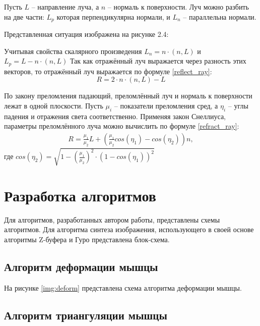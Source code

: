 Пусть $L$ -- направление луча, а $n$ -- нормаль к поверхности. 
Луч можно разбить на две части: $L_p$ которая перпендикулярна нормали, и  $L_n$ – параллельна нормали.

Представленная ситуация изображена на рисунке 2.4:


Учитывая свойства скалярного произведения $L_n = n \cdot (n, L)$ и  $L_p = L - n \cdot (n,L)$
Так как отражённый луч выражается через разность этих векторов, то отражённый луч выражается по формуле \ref{reflect_ray}:
\begin{equation}
\label{reflect_ray}
R = 2 \cdot n \cdot (n, L) - L
\end{equation}

По закону преломления падающий, преломлённый луч и нормаль к поверхности лежат в одной плоскости. 
Пусть $ \mu_i$ -- показатели преломления сред, а $\eta_i$ – углы падения и отражения света соответственно. 
Применяя закон Снеллиуса, параметры преломлённого луча можно вычислить по формуле \ref{refract_ray}:
\begin{equation}
\label{refract_ray}
\begin{aligned}
R = \frac{\mu_1}{\mu_2} L + ( \frac{\mu_1}{\mu_2} cos(\eta_1) - cos(\eta_2))n ,
\end{aligned}
\end{equation} 
где $cos(\eta_2) = \sqrt{1 - (\frac{\mu_1}{\mu_2})^2 \cdot (1 - cos(\eta_1))^2}$
\section{Разработка алгоритмов}

Для алгоритмов, разработанных автором работы, представлены схемы алгоритмов. Для алгоритма синтеза изображения, использующего в своей основе алгоритмы Z-буфера\cite{zbuf} и Гуро\cite{lmodels} представлена блок-схема.

\subsection{Алгоритм деформации мышцы}

На рисунке \ref{img:deform} представлена схема алгоритма деформации мышцы.


\clearpage
\subsection{Алгоритм триангуляции мышцы}



